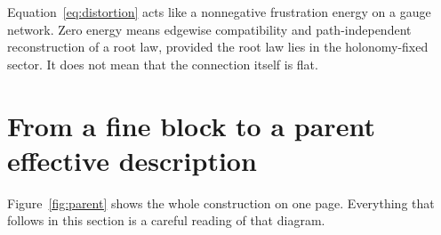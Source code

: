 \documentclass[11pt,letterpaper]{article}
\begin{document}
\begin{physicalreading}
Equation~\eqref{eq:distortion} acts like a nonnegative frustration energy on a gauge network. Zero energy means edgewise compatibility and path-independent reconstruction of a root law, provided the root law lies in the holonomy-fixed sector. It does not mean that the connection itself is flat.
\end{physicalreading}

\section{From a fine block to a parent effective description}
\label{sec:parent}

Figure~\ref{fig:parent} shows the whole construction on one page. Everything that follows in this section is a careful reading of that diagram.
\end{document}
